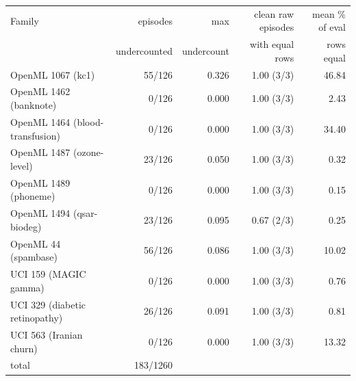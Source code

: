 \begin{tabular}{lrrrr}\toprule
Family & episodes & max & clean raw episodes & mean \% of eval\\
& undercounted & undercount & with equal rows & rows equal\\\midrule
OpenML 1067 (kc1) & 55/126 & 0.326 & 1.00 (3/3) & 46.84\\
OpenML 1462 (banknote) & 0/126 & 0.000 & 1.00 (3/3) & 2.43\\
OpenML 1464 (blood-transfusion) & 0/126 & 0.000 & 1.00 (3/3) & 34.40\\
OpenML 1487 (ozone-level) & 23/126 & 0.050 & 1.00 (3/3) & 0.32\\
OpenML 1489 (phoneme) & 0/126 & 0.000 & 1.00 (3/3) & 0.15\\
OpenML 1494 (qsar-biodeg) & 23/126 & 0.095 & 0.67 (2/3) & 0.25\\
OpenML 44 (spambase) & 56/126 & 0.086 & 1.00 (3/3) & 10.02\\
UCI 159 (MAGIC gamma) & 0/126 & 0.000 & 1.00 (3/3) & 0.76\\
UCI 329 (diabetic retinopathy) & 26/126 & 0.091 & 1.00 (3/3) & 0.81\\
UCI 563 (Iranian churn) & 0/126 & 0.000 & 1.00 (3/3) & 13.32\\
\midrule total & 183/1260 & & &\\
\bottomrule\end{tabular}
